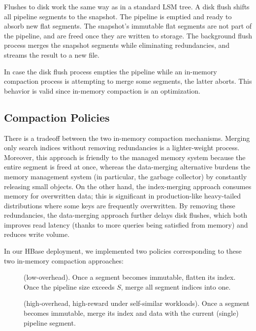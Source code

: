 Flushes to disk work the same way as in a standard LSM tree. A disk flush shifts all pipeline segments to the snapshot. The pipeline is emptied and ready to absorb new flat segments. The snapshot's immutable flat segments are not part of the pipeline, and are freed once they are written to storage. The background flush process merges the snapshot
segments while eliminating  redundancies, and streams the result to a new file. 

In case the disk flush process empties the pipeline while an in-memory compaction process is attempting to merge some segments, the latter aborts.  This behavior is valid since in-memory compaction is an optimization.

\subsection{Compaction Policies} \label{ssec:policies}

There is a tradeoff between the two in-memory compaction mechanisms. Merging only search indices without removing redundancies is a lighter-weight process.  Moreover, this approach is friendly to the managed memory system because the entire segment is freed at once, whereas 
the data-merging alternative burdens the memory management system (in particular, the garbage collector) by
constantly releasing small objects. On the other hand, the index-merging approach  
consumes memory for overwritten data; this is significant in production-like heavy-tailed distributions where some keys are frequently overwritten.
By removing these redundancies, the data-merging approach further delays disk flushes, which both improves read latency  (thanks to more 
queries being satisfied from memory) and reduces write volume.

In our HBase deployment, we implemented two policies corresponding to these two in-memory compaction approaches:
\begin{description}
\item[\basic] (low-overhead). Once a segment becomes immutable, flatten its index. Once the pipeline size exceeds $S$, 
merge all segment indices into one.  
\item[\eager] (high-overhead, high-reward under self-similar workloads). 
Once a segment becomes immutable, merge its index and data with the current (single) pipeline segment.
\end{description}

